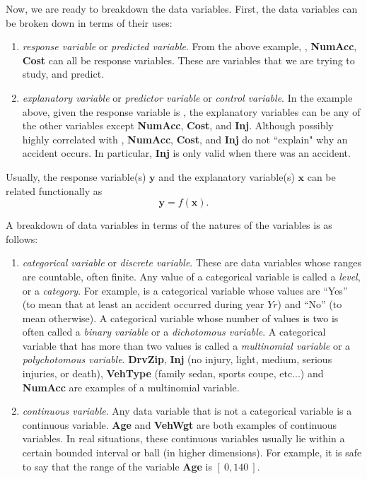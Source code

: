 \documentclass[12pt]{article}
\begin{document}
Now, we are ready to breakdown the data variables.  First, the data variables can be broken down in terms of their uses:
\begin{enumerate}
\item \emph{response variable} or \emph{predicted variable}.  From the above example, \textbf{}, \textbf{NumAcc}, \textbf{Cost} can all be response variables.  These are variables that we are trying to study, and predict.
\item \emph{explanatory variable} or \emph{predictor variable} or \emph{control variable}.  In the example above, given the response variable is \textbf{}, the explanatory variables can be any of the other variables except \textbf{NumAcc}, \textbf{Cost}, and \textbf{Inj}.  Although possibly highly correlated with \textbf{},  \textbf{NumAcc}, \textbf{Cost}, and \textbf{Inj} do not ``explain" why an accident occurs.  In particular, \textbf{Inj} is only valid when there was an accident.
\end{enumerate}
Usually, the response variable(s) $\boldsymbol{y}$ and the explanatory variable(s) $\boldsymbol{x}$ can be related functionally as 
$$\boldsymbol{y}=f(\boldsymbol{x}).$$
\par
A breakdown of data variables in terms of the natures of the variables is as follows:
\begin{enumerate}
\item \emph{categorical variable} or \emph{discrete variable}.  These are data variables whose ranges are countable, often finite.  Any value of a categorical variable is called a \emph{level}, or a \emph{category}.  For example, \textbf{} is a categorical variable whose values are ``Yes'' (to mean that at least an accident occurred during year $Yr$) and ``No'' (to mean otherwise).  A categorical variable whose number of values is two is often called a \emph{binary variable} or a \emph{dichotomous variable}.  A categorical variable that has more than two values is called a \emph{multinomial variable} or a \emph{polychotomous variable}.  \textbf{DrvZip}, \textbf{Inj} (no injury, light, medium, serious injuries, or death), \textbf{VehType} (family sedan, sports coupe, etc...) and \textbf{NumAcc} are examples of a multinomial variable.
\item \emph{continuous variable}.  Any data variable that is not a categorical variable is a continuous variable.  \textbf{Age} and \textbf{VehWgt} are both examples of continuous variables.  In real situations, these continuous variables usually lie within a certain bounded interval or ball (in higher dimensions).  For example, it is safe to say that the range of the variable \textbf{Age} is $[\ 0, 140\ ]$.
\end{enumerate}
\end{document}

